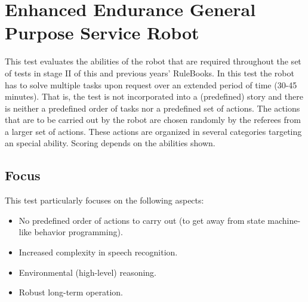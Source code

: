 %
%

\newcommand{\eegpsrTeams}{2~}
\newcommand{\eegpsrMaxCmd}{3~}
\newcommand{\eegpsrMaxCmdTime}{5~}
\newcommand{\eegpsrMaxTeamTime}{\eegpsrMaxCmd$\times$\eegpsrMaxCmdTime}

\section[EEGPSR]{Enhanced Endurance General Purpose Service Robot}
\label{sec:eegpsr}

%
%
This test evaluates the abilities of the robot that are required throughout the set of tests in stage II of this and previous years' RuleBooks. In this test the robot has to solve multiple tasks upon request over an extended period of time (30-45 minutes). That is, the test is not incorporated into a (predefined) story and there is neither a predefined order of tasks nor a predefined set of actions. The actions that are to be carried out by the robot are chosen randomly by the referees from a larger set of actions. These actions are organized in several categories targeting an special ability. Scoring depends on the abilities shown.

\subsection{Focus}
This test particularly focuses on the following aspects:
\begin{itemize}
	\item No predefined order of actions to carry out (to get away from state machine-like behavior programming).
	\item Increased complexity in speech recognition.
	\item Environmental (high-level) reasoning.
	\item Robust long-term operation.
\end{itemize}


